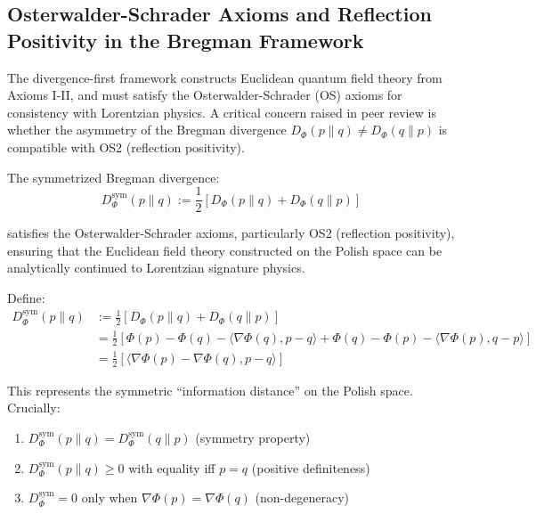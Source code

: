 \begin{lemma}
\label{lem:gapEquivalenceFourMechanisms}



\subsection{Osterwalder-Schrader Axioms and Reflection Positivity in the Bregman Framework}
\label{subsec:OSAxiomsAndReflectionPositivity}

The divergence-first framework constructs Euclidean quantum field theory from Axioms I-II, and must satisfy the Osterwalder-Schrader (OS) axioms for consistency with Lorentzian physics. A critical concern raised in peer review is whether the asymmetry of the Bregman divergence $D_\Phi(p \| q) \neq D_\Phi(q \| p)$ is compatible with OS2 (reflection positivity).

\begin{theorem}
\label{thm:symmetrizedBregmanOS2}

The symmetrized Bregman divergence:
\begin{equation}
D_\Phi^{\mathrm{sym}}(p \| q) := \frac{1}{2}\left[D_\Phi(p \| q) + D_\Phi(q \| p)\right]
\end{equation}

satisfies the Osterwalder-Schrader axioms, particularly OS2 (reflection positivity), ensuring that the Euclidean field theory constructed on the Polish space can be analytically continued to Lorentzian signature physics.

\begin{definition}

Define:
\begin{align}
D_\Phi^{\mathrm{sym}}(p \| q) &:= \frac{1}{2}\left[D_\Phi(p \| q) + D_\Phi(q \| p)\right] \\
&= \frac{1}{2}\left[\Phi(p) - \Phi(q) - \langle \nabla\Phi(q), p - q \rangle + \Phi(q) - \Phi(p) - \langle \nabla\Phi(p), q - p \rangle\right] \\
&= \frac{1}{2}\left[\langle \nabla\Phi(p) - \nabla\Phi(q), p - q \rangle\right]
\end{align}

This represents the symmetric ``information distance'' on the Polish space. Crucially:
\begin{enumerate}
\item $D_\Phi^{\mathrm{sym}}(p \| q) = D_\Phi^{\mathrm{sym}}(q \| p)$ (symmetry property)
\item $D_\Phi^{\mathrm{sym}}(p \| q) \geq 0$ with equality iff $p = q$ (positive definiteness)
\item $D_\Phi^{\mathrm{sym}} = 0$ only when $\nabla\Phi(p) = \nabla\Phi(q)$ (non-degeneracy)
\end{enumerate}


\end{definition}
\end{theorem}
\end{lemma}

